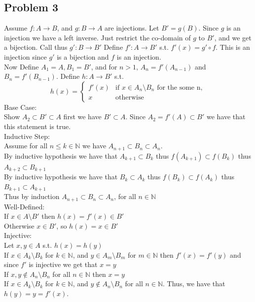 \documentclass[12pt, letterpaper]{article}
\theoremstyle{definition}
\newcommand{\N}{\mathbb{N}}
\begin{document}
\subsection*{Problem 3}
Assume $f : A \to B$, and $g: B \to A$ are injections. Let $B'=g(B)$. Since $g$ is an injection we have a left inverse. Just restrict the co-domain of $g$ to $B'$, and we get a bijection. Call thus $g':B \to B'$
Define $f': A \to B'$ s.t. $f'(x)=g' \circ f$. This is an injection since $g'$ is a bijection and $f$ is an injection.\\
Now Define $A_1=A, B_1=B'$, and for $n>1$, $A_n=f'(A_{n-1})$ and $B_n=f'(B_{n-1})$. Define $h: A \to B'$ s.t.
\begin{equation*}
    h(x)=\begin{cases}
            f'(x) & \text{if } x \in A_n \setminus B_n \text{ for the some n},\\
            x & \text{otherwise}
        \end{cases}
\end{equation*}
Base Case:\\
Show $A_2 \subset B' \subset A$ first we have $B' \subset A$. Since $A_2 = f'(A) \subset B'$ we have that this statement is true.\\
Inductive Step:\\
Assume for all $n \leq k \in \N$ we have $A_{n+1} \subset B_n \subset A_n$.\\
By inductive hypothesis we have that $A_{k+1} \subset B_k$ thus $f(A_{k+1}) \subset f(B_k)$ thus $A_{k+2} \subset B_{k+1}$\\
By inductive hypothesis we have that $B_k \subset A_k$ thus $f(B_{k}) \subset f(A_k)$ thus $B_{k+1} \subset A_{k+1}$\\
Thus by induction $A_{n+1} \subset B_n \subset A_n$, for all $n \in \N$\\
Well-Defined:\\
If $x \in A \setminus B'$ then $h(x)=f'(x) \in B'$\\
Otherwise $x \in B'$, so $h(x)=x \in B'$\\
Injective:\\
Let $x,y \in A$ s.t. $h(x)=h(y)$\\
If $x \in A_k \setminus B_k$ for $k \in \N$, and $y \in A_m \setminus B_m$ for $m \in \N$ then $f'(x)=f'(y)$ and since $f'$ is injective we get that $x=y$\\
If $x,y \notin A_n \setminus B_n$ for all $n \in \N$ then $x=y$\\
If $x \in A_k \setminus B_k$ for $k \in \N$, and $y \notin A_n \setminus B_n$ for all $n \in \N$. Thus, we have that $h(y)=y=f'(x)$.
\end{document}
